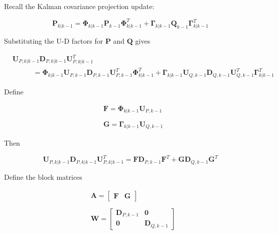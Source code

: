 Recall the Kalman covariance projection update:

\begin{equation*}
    \mathbf{P}_{k|k-1} = \mathbf{\Phi}_{k|k-1} \mathbf{P}_{k-1} \mathbf{\Phi}_{k|k-1}^T + \mathbf{\Gamma}_{k|k-1} \mathbf{Q}_{k-1} \mathbf{\Gamma}_{k|k-1}^T
\end{equation*}

Substituting the U-D factors for $\mathbf{P}$ and $\mathbf{Q}$ gives

\begin{equation*}
    \begin{aligned}
        & \mathbf{U}_{P,k|k-1} \mathbf{D}_{P,k|k-1} \mathbf{U}_{P,k|k-1}^T \\
        & \phantom{MMM} = \mathbf{\Phi}_{k|k-1} \mathbf{U}_{P,k-1} \mathbf{D}_{P,k-1} \mathbf{U}_{P,k-1}^T \mathbf{\Phi}_{k|k-1}^T
        + \mathbf{\Gamma}_{k|k-1} \mathbf{U}_{Q,k-1} \mathbf{D}_{Q,k-1} \mathbf{U}_{Q,k-1}^T \mathbf{\Gamma}_{k|k-1}^T
    \end{aligned}
\end{equation*}

Define

\begin{equation*}
    \begin{aligned}
        & \mathbf{F} = \mathbf{\Phi}_{k|k-1} \mathbf{U}_{P,k-1} \\
        &\phantom{.} \\
        & \mathbf{G} = \mathbf{\Gamma}_{k|k-1} \mathbf{U}_{Q,k-1}
    \end{aligned}
\end{equation*}

Then

\begin{equation*}
    \mathbf{U}_{P,k|k-1} \mathbf{D}_{P,k|k-1} \mathbf{U}_{P,k|k-1}^T
    = \mathbf{F} \mathbf{D}_{P,k-1} \mathbf{F}^T
    + \mathbf{G} \mathbf{D}_{Q,k-1} \mathbf{G}^T
\end{equation*}

Define the block matrices

\begin{equation*}
    \begin{aligned}
        &\mathbf{A} =
        \begin{bmatrix}
         \mathbf{F} & \mathbf{G}
        \end{bmatrix} \\
        &\phantom{.} \\
        &\mathbf{W} =
        \begin{bmatrix}
         \mathbf{D}_{P,k-1} & \mathbf{0} \\
         \mathbf{0} & \mathbf{D}_{Q,k-1}
        \end{bmatrix}
    \end{aligned}
\end{equation*}

